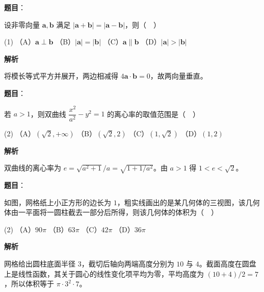 \begin{answer}

\textbf{题目}：

设非零向量 \(\boldsymbol a,\boldsymbol b\) 满足 \(|\boldsymbol a+\boldsymbol b|=|\boldsymbol a-\boldsymbol b|\)，则（　）

\begin{gkopts}(1)
\task （A）\(\boldsymbol a\perp\boldsymbol b\)
\task （B）\(|\boldsymbol a|=|\boldsymbol b|\)
\task （C）\(\boldsymbol a\parallel\boldsymbol b\)
\task （D）\(|\boldsymbol a|>|\boldsymbol b|\)
\end{gkopts}

\textbf{解析}

将模长等式平方并展开，两边相减得 \(4\boldsymbol a\cdot\boldsymbol b=0\)，故两向量垂直。


\end{answer}
\begin{answer}

\textbf{题目}：

若 \(a>1\)，则双曲线 \(\dfrac{x^2}{a^2}-y^2=1\) 的离心率的取值范围是（　）

\begin{gkopts}(2)
\task （A）\((\sqrt2,+\infty)\)
\task （B）\((\sqrt2,2)\)
\task （C）\((1,\sqrt2)\)
\task （D）\((1,2)\)
\end{gkopts}

\textbf{解析}

双曲线的离心率为 \(e=\sqrt{a^2+1}/a=\sqrt{1+1/a^2}\)。由 \(a>1\) 得 \(1<e<\sqrt2\)。


\end{answer}
\begin{answer}

\textbf{题目}：

如图，网格纸上小正方形的边长为 \(1\)，粗实线画出的是某几何体的三视图，该几何体由一平面将一圆柱截去一部分后所得，则该几何体的体积为（　）
\nopagebreak[4]
\begin{center}\end{center}
\nopagebreak[4]
\begin{gkopts}(2)
\task （A）\(90\pi\)
\task （B）\(63\pi\)
\task （C）\(42\pi\)
\task （D）\(36\pi\)
\end{gkopts}

\textbf{解析}

网格给出圆柱底面半径 \(3\)，截切后轴向两端高度分别为 \(10\) 与 \(4\)。截面高度在圆盘上是线性函数，其关于圆心的线性变化项平均为零，平均高度为 \((10+4)/2=7\)，所以体积等于 \(\pi\cdot3^2\cdot7\)。


\end{answer}
